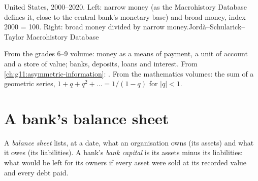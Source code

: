 \begin{openingchart}{United States, 2000--2020. Left: narrow money (as the Macrohistory Database defines it, close to the central bank's monetary base) and broad money,
index 2000 = 100. Right: broad money divided by narrow money.}{Jordà--Schularick--Taylor Macrohistory Database}
\end{openingchart}

\begin{recall}
From the grades 6--9 volume: money as a means of payment, a unit of account and a store of value; banks, deposits, loans and interest. From
\cref{ch:g11:asymmetric-information}: . From the mathematics volumes: the sum of a geometric series, $1 + q + q^2 + \dots = 1/(1 - q)$ for $|q| < 1$.
\end{recall}

\section{A bank's balance sheet}\label{sec:g11:money-and-banking:balance-sheet}

\begin{definition}\label{def:g11:money-and-banking:balance-sheet}
A \emph{balance sheet} lists, at a date, what an organisation owns (its assets) and what it owes (its liabilities). A bank's \emph{bank capital}\label{def:g11:money-and-banking:bank-capital} is its assets minus its liabilities: what would be left for its owners if every asset were sold at its
recorded value and every debt paid.
\end{definition}


